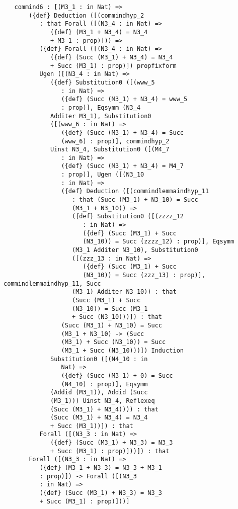 \documentclass[12pt]{article}
\begin{document}
\begin{verbatim}
   commind6 : [(M3_1 : in Nat) => 
       ({def} Deduction ([(commindhyp_2 
          : that Forall ([(N3_4 : in Nat) => 
             ({def} (M3_1 + N3_4) = N3_4 
             + M3_1 : prop)])) => 
          ({def} Forall ([(N3_4 : in Nat) => 
             ({def} (Succ (M3_1) + N3_4) = N3_4 
             + Succ (M3_1) : prop)]) propfixform 
          Ugen ([(N3_4 : in Nat) => 
             ({def} Substitution0 ([(www_5 
                : in Nat) => 
                ({def} (Succ (M3_1) + N3_4) = www_5 
                : prop)], Eqsymm (N3_4 
             Additer M3_1), Substitution0 
             ([(www_6 : in Nat) => 
                ({def} (Succ (M3_1) + N3_4) = Succ 
                (www_6) : prop)], commindhyp_2 
             Uinst N3_4, Substitution0 ([(M4_7 
                : in Nat) => 
                ({def} (Succ (M3_1) + N3_4) = M4_7 
                : prop)], Ugen ([(N3_10 
                : in Nat) => 
                ({def} Deduction ([(commindlemmaindhyp_11 
                   : that (Succ (M3_1) + N3_10) = Succ 
                   (M3_1 + N3_10)) => 
                   ({def} Substitution0 ([(zzzz_12 
                      : in Nat) => 
                      ({def} (Succ (M3_1) + Succ 
                      (N3_10)) = Succ (zzzz_12) : prop)], Eqsymm 
                   (M3_1 Additer N3_10), Substitution0 
                   ([(zzz_13 : in Nat) => 
                      ({def} (Succ (M3_1) + Succ 
                      (N3_10)) = Succ (zzz_13) : prop)], commindlemmaindhyp_11, Succ 
                   (M3_1) Additer N3_10)) : that 
                   (Succ (M3_1) + Succ 
                   (N3_10)) = Succ (M3_1 
                   + Succ (N3_10)))]) : that 
                (Succ (M3_1) + N3_10) = Succ 
                (M3_1 + N3_10) -> (Succ 
                (M3_1) + Succ (N3_10)) = Succ 
                (M3_1 + Succ (N3_10)))]) Induction 
             Substitution0 ([(N4_10 : in 
                Nat) => 
                ({def} (Succ (M3_1) + 0) = Succ 
                (N4_10) : prop)], Eqsymm 
             (Addid (M3_1)), Addid (Succ 
             (M3_1))) Uinst N3_4, Reflexeq 
             (Succ (M3_1) + N3_4)))) : that 
             (Succ (M3_1) + N3_4) = N3_4 
             + Succ (M3_1))]) : that 
          Forall ([(N3_3 : in Nat) => 
             ({def} (Succ (M3_1) + N3_3) = N3_3 
             + Succ (M3_1) : prop)]))]) : that 
       Forall ([(N3_3 : in Nat) => 
          ({def} (M3_1 + N3_3) = N3_3 + M3_1 
          : prop)]) -> Forall ([(N3_3 
          : in Nat) => 
          ({def} (Succ (M3_1) + N3_3) = N3_3 
          + Succ (M3_1) : prop)]))]



\end{verbatim}
\end{document}
